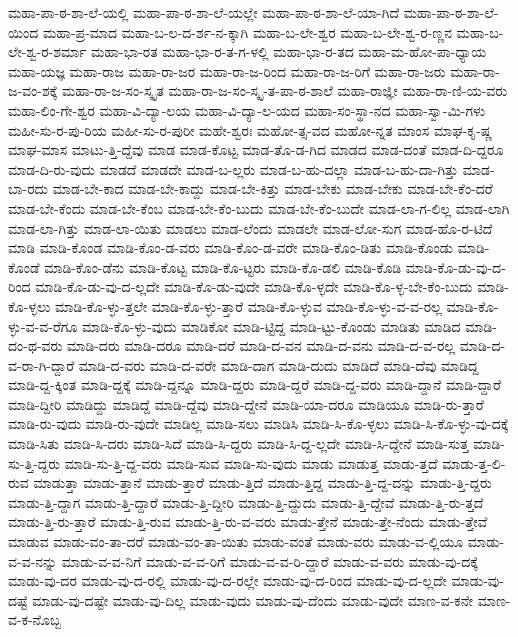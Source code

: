 {ಮಹಾ-ಪಾ-ಠ-ಶಾ-ಲೆ-ಯಲ್ಲಿ
ಮಹಾ-ಪಾ-ಠ-ಶಾ-ಲೆ-ಯಲ್ಲೇ
ಮಹಾ-ಪಾ-ಠ-ಶಾ-ಲೆ-ಯಾ-ಗಿದೆ
ಮಹಾ-ಪಾ-ಠ-ಶಾ-ಲೆ-ಯಿಂದ
ಮಹಾ-ಪ್ರ-ಮಾದ
ಮಹಾ-ಬ-ಲ-ದ-ರ್ಶ-ನ-ಕ್ಕಾಗಿ
ಮಹಾ-ಬ-ಲೇ-ಶ್ವರ
ಮಹಾ-ಬ-ಲೇ-ಶ್ವ-ರ-ಣ್ಣನ
ಮಹಾ-ಬ-ಲೇ-ಶ್ವ-ರ-ಶರ್ಮಾ
ಮಹಾ-ಭಾ-ರತ
ಮಹಾ-ಭಾ-ರ-ತ-ಗ-ಳಲ್ಲಿ
ಮಹಾ-ಭಾ-ರ-ತದ
ಮಹಾ-ಮ-ಹೋ-ಪಾ-ಧ್ಯಾಯ
ಮಹಾ-ಯಜ್ಞ
ಮಹಾ-ರಾಜ
ಮಹಾ-ರಾ-ಜರ
ಮಹಾ-ರಾ-ಜ-ರಿಂದ
ಮಹಾ-ರಾ-ಜ-ರಿಗೆ
ಮಹಾ-ರಾ-ಜರು
ಮಹಾ-ರಾ-ಜ-ವಂ-ಶಕ್ಕೆ
ಮಹಾ-ರಾ-ಜ-ಸಂ-ಸ್ಕೃತ
ಮಹಾ-ರಾ-ಜ-ಸಂ-ಸ್ಕೃ-ತ-ಪಾ-ಠ-ಶಾಲೆ
ಮಹಾ-ರಾಜ್ಞೀ
ಮಹಾ-ರಾ-ಣಿ-ಯ-ವರು
ಮಹಾ-ಲಿಂ-ಗೇ-ಶ್ವರ
ಮಹಾ-ವಿ-ದ್ಯಾ-ಲಯ
ಮಹಾ-ವಿ-ದ್ಯಾ-ಲ-ಯದ
ಮಹಾ-ಸಂ-ಸ್ಥಾ-ನದ
ಮಹಾ-ಸ್ವಾ-ಮಿ-ಗಳು
ಮಹೀ-ಸು-ರ-ಪು-ರಿಯ
ಮಹೀ-ಸು-ರ-ಪುರೀ
ಮಹೇ-ಶ್ವರಃ
ಮಹೋ-ತ್ಸ-ವದ
ಮಹೋ-ನ್ನತ
ಮಾಂಸ
ಮಾಘ-ಕೃ-ಷ್ಣ
ಮಾಘ-ಮಾಸ
ಮಾಟು-ತ್ತಿ-ದ್ದೆವು
ಮಾಡ
ಮಾಡ-ಕೊಟ್ಟ
ಮಾಡ-ತೊ-ಡ-ಗಿದ
ಮಾಡದ
ಮಾಡ-ದಂತೆ
ಮಾಡ-ದಿ-ದ್ದರೂ
ಮಾಡ-ದಿ-ರು-ವುದು
ಮಾಡದೆ
ಮಾಡದೇ
ಮಾಡ-ಬ-ಲ್ಲರು
ಮಾಡ-ಬ-ಹು-ದಲ್ಲಾ
ಮಾಡ-ಬ-ಹು-ದಾ-ಗಿತ್ತು
ಮಾಡ-ಬಾ-ರದು
ಮಾಡ-ಬೇ-ಕಾದ
ಮಾಡ-ಬೇ-ಕಾದ್ದು
ಮಾಡ-ಬೇ-ಕಿತ್ತು
ಮಾಡ-ಬೇಕು
ಮಾಡ-ಬೇಕು
ಮಾಡ-ಬೇ-ಕೆಂ-ದರೆ
ಮಾಡ-ಬೇ-ಕೆಂದು
ಮಾಡ-ಬೇ-ಕೆಂಬ
ಮಾಡ-ಬೇ-ಕೆಂ-ಬುದು
ಮಾಡ-ಬೇ-ಕೆಂ-ಬುದೇ
ಮಾಡ-ಲಾ-ಗ-ಲಿಲ್ಲ
ಮಾಡ-ಲಾಗಿ
ಮಾಡ-ಲಾ-ಗಿತ್ತು
ಮಾಡ-ಲಾ-ಯಿತು
ಮಾಡಲು
ಮಾಡ-ಲೆಂದು
ಮಾಡಲೇ
ಮಾಡ-ಲೋ-ಸುಗ
ಮಾಡ-ಹೊ-ರ-ಟಿದೆ
ಮಾಡಿ
ಮಾಡಿ-ಕೊಂಡ
ಮಾಡಿ-ಕೊಂ-ಡ-ವರು
ಮಾಡಿ-ಕೊಂ-ಡ-ವರೇ
ಮಾಡಿ-ಕೊಂ-ಡಿತು
ಮಾಡಿ-ಕೊಂಡು
ಮಾಡಿ-ಕೊಂಡೆ
ಮಾಡಿ-ಕೊಂ-ಡೆನು
ಮಾಡಿ-ಕೊಟ್ಟ
ಮಾಡಿ-ಕೊ-ಟ್ಟರು
ಮಾಡಿ-ಕೊ-ಡಲಿ
ಮಾಡಿ-ಕೊಡಿ
ಮಾಡಿ-ಕೊ-ಡು-ವು-ದ-ರಿಂದ
ಮಾಡಿ-ಕೊ-ಡು-ವು-ದ-ಲ್ಲದೇ
ಮಾಡಿ-ಕೊ-ಡು-ವುದೇ
ಮಾಡಿ-ಕೊ-ಳ್ಳದೇ
ಮಾಡಿ-ಕೊ-ಳ್ಳ-ಬೇ-ಕೆಂ-ಬುದು
ಮಾಡಿ-ಕೊ-ಳ್ಳಲು
ಮಾಡಿ-ಕೊ-ಳ್ಳು-ತ್ತಲೇ
ಮಾಡಿ-ಕೊ-ಳ್ಳು-ತ್ತಾರೆ
ಮಾಡಿ-ಕೊ-ಳ್ಳುವ
ಮಾಡಿ-ಕೊ-ಳ್ಳು-ವ-ವ-ರಲ್ಲ
ಮಾಡಿ-ಕೊ-ಳ್ಳು-ವ-ವ-ರೆಗೂ
ಮಾಡಿ-ಕೊ-ಳ್ಳು-ವುದು
ಮಾಡಿಕೋ
ಮಾಡಿ-ಟ್ಟಿದ್ದ
ಮಾಡಿ-ಟ್ಟು-ಕೊಂಡು
ಮಾಡಿತು
ಮಾಡಿದ
ಮಾಡಿ-ದಂ-ಥ-ವರು
ಮಾಡಿ-ದರು
ಮಾಡಿ-ದರೂ
ಮಾಡಿ-ದರೆ
ಮಾಡಿ-ದ-ವನ
ಮಾಡಿ-ದ-ವನು
ಮಾಡಿ-ದ-ವ-ರಲ್ಲ
ಮಾಡಿ-ದ-ವ-ರಾ-ಗಿ-ದ್ದಾರೆ
ಮಾಡಿ-ದ-ವರು
ಮಾಡಿ-ದ-ವರೇ
ಮಾಡಿ-ದಾಗ
ಮಾಡಿ-ದುದು
ಮಾಡಿದೆ
ಮಾಡಿ-ದೆವು
ಮಾಡಿದ್ದ
ಮಾಡಿ-ದ್ದ-ಕ್ಕಿಂತ
ಮಾಡಿ-ದ್ದಕ್ಕೆ
ಮಾಡಿ-ದ್ದನ್ನೂ
ಮಾಡಿ-ದ್ದರು
ಮಾಡಿ-ದ್ದರೆ
ಮಾಡಿ-ದ್ದ-ವರು
ಮಾಡಿ-ದ್ದಾನೆ
ಮಾಡಿ-ದ್ದಾರೆ
ಮಾಡಿ-ದ್ದೀರಿ
ಮಾಡಿದ್ದು
ಮಾಡಿದ್ದೆ
ಮಾಡಿ-ದ್ದೆವು
ಮಾಡಿ-ದ್ದೇನೆ
ಮಾಡಿ-ಯಾ-ದರೂ
ಮಾಡಿಯೂ
ಮಾಡಿ-ರು-ತ್ತಾರೆ
ಮಾಡಿ-ರು-ವುದು
ಮಾಡಿ-ರು-ವುದೇ
ಮಾಡಿಲ್ಲ
ಮಾಡಿ-ಸಲು
ಮಾಡಿಸಿ
ಮಾಡಿ-ಸಿ-ಕೊ-ಳ್ಳಲು
ಮಾಡಿ-ಸಿ-ಕೊ-ಳ್ಳು-ವು-ದಕ್ಕೆ
ಮಾಡಿ-ಸಿತು
ಮಾಡಿ-ಸಿ-ದರು
ಮಾಡಿ-ಸಿದೆ
ಮಾಡಿ-ಸಿ-ದ್ದರು
ಮಾಡಿ-ಸಿ-ದ್ದ-ಲ್ಲದೇ
ಮಾಡಿ-ಸಿ-ದ್ದೇನೆ
ಮಾಡಿ-ಸುತ್ತ
ಮಾಡಿ-ಸು-ತ್ತಿ-ದ್ದರು
ಮಾಡಿ-ಸು-ತ್ತಿ-ದ್ದ-ವರು
ಮಾಡಿ-ಸುವ
ಮಾಡಿ-ಸು-ವುದು
ಮಾಡು
ಮಾಡುತ್ತ
ಮಾಡು-ತ್ತದೆ
ಮಾಡು-ತ್ತ-ಲಿ-ರುವ
ಮಾಡುತ್ತಾ
ಮಾಡು-ತ್ತಾನೆ
ಮಾಡು-ತ್ತಾರೆ
ಮಾಡು-ತ್ತಿದೆ
ಮಾಡು-ತ್ತಿದ್ದ
ಮಾಡು-ತ್ತಿ-ದ್ದ-ದನ್ನು
ಮಾಡು-ತ್ತಿ-ದ್ದರು
ಮಾಡು-ತ್ತಿ-ದ್ದಾಗ
ಮಾಡು-ತ್ತಿ-ದ್ದಾರೆ
ಮಾಡು-ತ್ತಿ-ದ್ದೀರಿ
ಮಾಡು-ತ್ತಿ-ದ್ದುದು
ಮಾಡು-ತ್ತಿ-ದ್ದೇವೆ
ಮಾಡು-ತ್ತಿ-ರು-ತ್ತದೆ
ಮಾಡು-ತ್ತಿ-ರು-ತ್ತಾರೆ
ಮಾಡು-ತ್ತಿ-ರುವ
ಮಾಡು-ತ್ತಿ-ರು-ವ-ವರು
ಮಾಡು-ತ್ತೇನೆ
ಮಾಡು-ತ್ತೇ-ನೆಂದು
ಮಾಡು-ತ್ತೇವೆ
ಮಾಡುವ
ಮಾಡು-ವಂ-ತಾ-ದರೆ
ಮಾಡು-ವಂ-ತಾ-ಯಿತು
ಮಾಡು-ವಂತೆ
ಮಾಡು-ವರು
ಮಾಡು-ವ-ಲ್ಲಿಯೂ
ಮಾಡು-ವ-ವ-ನನ್ನು
ಮಾಡು-ವ-ವ-ನಿಗೆ
ಮಾಡು-ವ-ವ-ರಿಗೆ
ಮಾಡು-ವ-ವ-ರಿ-ದ್ದಾರೆ
ಮಾಡು-ವ-ವರು
ಮಾಡು-ವು-ದಕ್ಕೆ
ಮಾಡು-ವು-ದರ
ಮಾಡು-ವು-ದ-ರಲ್ಲಿ
ಮಾಡು-ವು-ದ-ರಲ್ಲೇ
ಮಾಡು-ವು-ದ-ರಿಂದ
ಮಾಡು-ವು-ದ-ಲ್ಲದೇ
ಮಾಡು-ವು-ದಷ್ಟೆ
ಮಾಡು-ವು-ದಷ್ಟೇ
ಮಾಡು-ವು-ದಿಲ್ಲ
ಮಾಡು-ವುದು
ಮಾಡು-ವು-ದೆಂದು
ಮಾಡು-ವುದೇ
ಮಾಣ-ವ-ಕನೇ
ಮಾಣ-ವ-ಕ-ನೊಬ್ಬ
}
